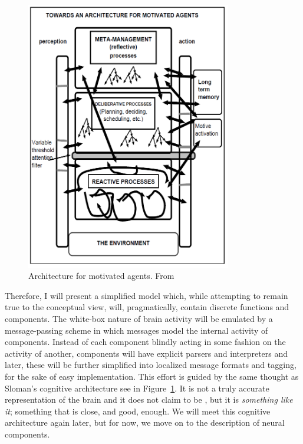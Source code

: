 \begin{figure}
	\centering
	\includegraphics[width=0.8\textwidth]{Figs/slomanSystem.png}
	\caption{Architecture for motivated agents. From \cite[p. 10]{sloman1997}}
	\label{fig:slomanSystem}
\end{figure}

Therefore, I will present a simplified model which, while attempting to remain true to the conceptual view, will, pragmatically, contain discrete functions and components. The white-box nature of brain activity will be emulated by a message-passing scheme in which messages model the internal activity of components. Instead of each component blindly acting in some fashion on the activity of another, components will have explicit parsers and interpreters and later, these will be further simplified into localized message formats and tagging, for the sake of easy implementation.
This effort is guided by the same thought as Sloman's cognitive architecture see in Figure~\ref{fig:slomanSystem}. It is not a truly accurate representation of the brain and it does not claim to be , but it is {\em something like it}; something that is close, and good, enough. We will meet this cognitive architecture again later, but for now, we move on to the description of neural components.

